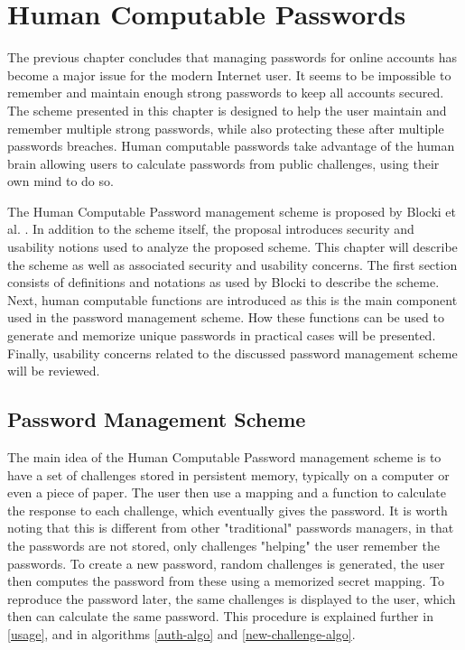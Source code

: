 \chapter{Human Computable Passwords}\label{ch:hcp}
The previous chapter concludes that managing passwords for online accounts has become a major issue for the modern Internet user. It seems to be impossible to remember and maintain enough strong passwords to keep all accounts secured. The scheme presented in this chapter is designed to help the user maintain and remember multiple strong passwords, while also protecting these after multiple passwords breaches. Human computable passwords take advantage of the human brain allowing users to calculate passwords from public challenges, using their own mind to do so. 

\par The Human Computable Password management scheme is proposed by Blocki et al. \cite{hcp-blocki}. In addition to the scheme itself, the proposal introduces security and usability notions used to analyze the proposed scheme. This chapter will describe the scheme as well as associated security and usability concerns. The first section consists of definitions and notations as used by Blocki \cite{hcp-blocki} to describe the scheme. Next, human computable functions are introduced as this is the main component used in the password management scheme. How these functions can be used to generate and memorize unique passwords in practical cases will be presented. Finally, usability concerns related to the discussed password management scheme will be reviewed.

\section{Password Management Scheme}
The main idea of the Human Computable Password management scheme is to have a set of challenges stored in persistent memory, typically on a computer or even a piece of paper. The user then use a mapping and a function to calculate the response to each challenge, which eventually gives the password. It is worth noting that this is different from other "traditional" passwords managers, in that the passwords are not stored, only challenges "helping" the user remember the passwords. To create a new password, random challenges is generated, the user then computes the password from these using a memorized secret mapping. To reproduce the password later, the same challenges is displayed to the user, which then can calculate the same password. This procedure is explained further in \autoref{usage}, and in algorithms \ref{auth-algo} and \autoref{new-challenge-algo}.


